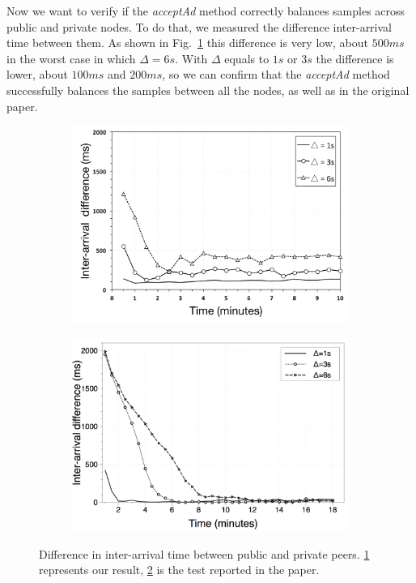 Now we want to verify if the \textit{acceptAd} method correctly balances samples across public and private nodes. To do that, we measured the difference inter-arrival time between them. As shown in Fig.~\ref{fig:interarrivaltime_difference} this difference is very low, about $500 ms$ in the worst case in which $\Delta = 6 s$. With $\Delta$ equals to $1s$ or $3s$ the difference is lower, about $100ms$ and $200ms$, so we can confirm that the \textit{acceptAd} method successfully balances the samples between all the nodes, as well as in the original paper.

\begin{figure}
\centering
\begin{subfigure}{.5\textwidth}
  \centering
  \includegraphics[keepaspectratio=true, width=1\linewidth]{images/interarrivaltime_difference}
  \caption{}
  \label{fig:interarrivaltime_difference}
\end{subfigure}%
\begin{subfigure}{.5\textwidth}
  \centering
  \includegraphics[keepaspectratio=true, width=1\linewidth]{images/paper_interarrivaltime_difference}
  \caption{}
  \label{fig:paper_interarrivaltime_difference}
\end{subfigure}
\caption{Difference in inter-arrival time between public and private peers. \ref{fig:interarrivaltime_difference} represents our result, \ref{fig:paper_interarrivaltime_difference} is the test reported in the paper.}
\label{fig:ad_interarrivaltime_difference}
\end{figure}


